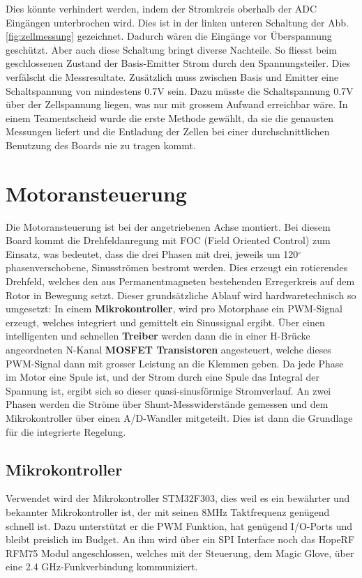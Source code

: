 Dies könnte verhindert werden, indem der Stromkreis oberhalb der ADC Eingängen unterbrochen wird. Dies ist in der linken unteren Schaltung der Abb.\ref{fig:zellmessung} gezeichnet. Dadurch wären die Eingänge vor Überspannung geschützt. Aber auch diese Schaltung bringt diverse Nachteile. So fliesst beim geschlossenen Zustand der Basis-Emitter Strom durch den Spannungsteiler. Dies verfälscht die Messresultate. Zusätzlich muss zwischen Basis und Emitter eine Schaltspannung von mindestens 0.7V sein. Dazu müsste die Schaltspannung 0.7V über der Zellspannung liegen, was nur mit grossem Aufwand erreichbar wäre. 
In einem Teamentscheid wurde die erste Methode gewählt, da sie die genausten Messungen liefert und die Entladung der Zellen bei einer durchschnittlichen Benutzung des Boards nie  zu tragen kommt.

\section{Motoransteuerung}
\label{HW_Motoransteuerung}
Die Motoransteuerung ist bei der angetriebenen Achse montiert. Bei diesem Board kommt die Drehfeldanregung mit FOC (Field Oriented Control) zum Einsatz, was bedeutet, dass die drei Phasen mit drei, jeweils um 120\(^\circ\) phasenverschobene, Sinusströmen bestromt werden. Dies erzeugt ein rotierendes Drehfeld, welches den aus Permanentmagneten bestehenden Erregerkreis auf dem Rotor in Bewegung setzt. Dieser grundsätzliche Ablauf wird hardwaretechnisch so umgesetzt:
In einem \textbf{Mikrokontroller}, wird pro Motorphase ein PWM-Signal erzeugt, welches integriert und gemittelt ein Sinussignal ergibt. Über einen intelligenten und schnellen \textbf{Treiber} werden dann die in einer H-Brücke angeordneten N-Kanal \textbf{MOSFET Transistoren} angesteuert, welche dieses PWM-Signal dann mit grosser Leistung an die Klemmen geben. Da jede Phase im Motor eine Spule ist, und der Strom durch eine Spule das Integral der Spannung ist, ergibt sich so dieser quasi-sinusförmige Stromverlauf.
An zwei Phasen werden die Ströme über Shunt-Messwiderstände gemessen und dem Mikrokontroller über einen A/D-Wandler mitgeteilt. Dies ist dann die Grundlage für die integrierte Regelung.

\subsection*{Mikrokontroller}
Verwendet wird der Mikrokontroller STM32F303, dies weil es ein bewährter und bekannter Mikrokontroller ist, der mit seinen 8MHz Taktfrequenz genügend schnell ist. Dazu unterstützt er die PWM Funktion, hat genügend I/O-Ports und bleibt preislich im Budget.
An ihm wird über ein SPI Interface noch das HopeRF RFM75 Modul angeschlossen, welches mit der Steuerung, dem Magic Glove, über eine 2.4 GHz-Funkverbindung kommuniziert.

